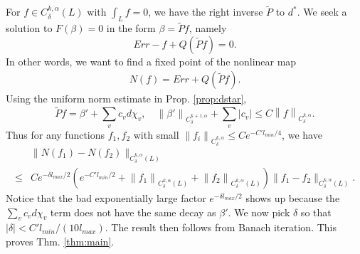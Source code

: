 \documentclass{article}
\theoremstyle{definition}
\newcommand{\norm}[1]{\left\lVert#1\right\rVert}
\begin{document}
	
	
	For $f\in C^{k,\alpha}_\delta(L)$ with $\int_{L} f=0$, we have the right inverse $\tilde{P}$ to $d^*$. We seek a solution to $F(\beta)=0$ in the form $\beta= \tilde{P} f$, namely
	\[
	Err- f + Q(\tilde{P} f)=0.
	\]
	In other words, we want to find a fixed point of the nonlinear map
	\begin{align*}
		N(f) = Err +  Q(\tilde{P} f).
	\end{align*}
	Using the uniform norm estimate in Prop. \ref{prop:dstar}, 
	\[
	\tilde{P} f= \beta'+ \sum_v c_v d\chi_v,\quad    \norm{\beta'}_{C^{k+1,\alpha}_\delta} + \sum_v |c_v| \leq C \norm{f}_{C^{k,\alpha}_\delta}. 
	\]
	Thus  for any functions $f_1, f_2$ with small $\norm{f_i}_{C^{k,\alpha}_\delta} \leq C e^{-C' l_{min}/4} $,  we have
	\[
	\begin{split}
	&	\|N(f_1) - N(f_2)\|_{C^{k,\alpha}_\delta(L)} 
		\\
	\leq 	&  C e^{-\delta l_{max}/2}(  e^{-C'l_{min}/2} +\norm{f_1}_{C^{k,\alpha}_\delta(L)}+  \norm{f_2}_{C^{k,\alpha}_\delta(L)} )  \|f_1-f_2\|_{C^{k,\alpha}_\delta(L)}.
	\end{split}
	\]
	Notice that the bad exponentially large factor $e^{-\delta l_{max}/2}$ shows up because the $\sum_v c_v d\chi_v$ term does not have the same decay as $\beta'$.
	We now pick $\delta$ so that $|\delta| < C' l_{min}/ (10 l_{max})$. 
	The result then follows from  Banach iteration.
	This proves Thm. \ref{thm:main}.
    
\end{document}
